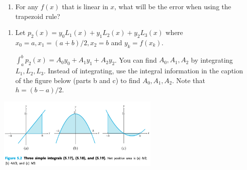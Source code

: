 \documentclass[12pt,letterpaper,noanswers]{exam}
\begin{document}


\begin{enumerate}[resume=classQ]
\item For any $f(x)$ that is linear in $x$, what will be the error when using the trapezoid rule?
\vspace{1cm}
\end{enumerate}



\begin{enumerate}[resume=classQ]
    \item Let $p_2(x) = y_0L_1(x) + y_1L_2(x)+y_2L_3(x)$ where $x_0 = a, x_1 = (a+b)/2, x_2 = b$ and $y_k = f(x_k)$.  
    
    $\displaystyle\int_a^b p_2(x) = A_0 y_0 + A_1 y_1 + A_2 y_2$.  You can find $A_0, A_1, A_2$ by integrating $L_1, L_2, L_3$.  Instead of integrating, use the integral information in the caption of the figure below (parts b and c) to find $A_0, A_1, A_2$.  Note that $h = (b-a)/2$.
\end{enumerate}


    \includegraphics[width=0.6\textwidth]{img/Class12Sauerintegrals.png}
\begin{enumerate}[resume=classQ]
    
    
\end{enumerate}
\end{document}
